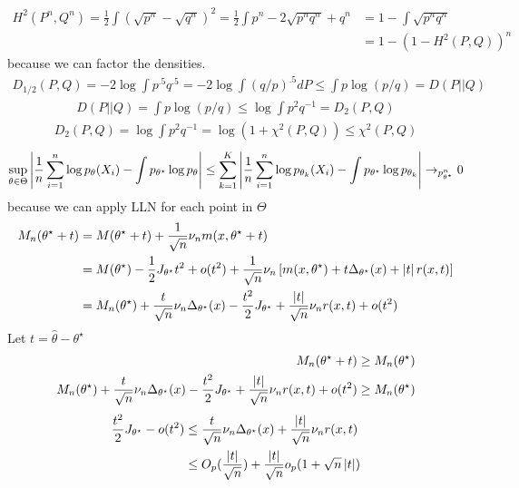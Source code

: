 \documentclass[hidequestions]{homework}
\begin{document}
\subproblem 
\begin{align*}
    H^2(P^n,Q^n) = \frac{1}{2}\int(\sqrt{p^n}-\sqrt{q^n})^2 = \frac{1}{2}\int p^n - 2\sqrt{p^nq^n} + q^n &= 1 - \int \sqrt{p^nq^n}\\
    &= 1-(1-H^2(P,Q))^n
\end{align*}
because we can factor the densities.
\problem 
\subproblem 
\begin{align*}
    D_{1/2}(P,Q) = -2\log \int p^{.5}q^{.5} = -2 \log \int (q/p)^{.5} dP \leq \int p\log(p/q) = D(P\vert\vert Q)
\end{align*}
\subproblem
\begin{align*}
    D(P\vert\vert Q) = \int p\log(p/q) \leq \log \int p^2 q^{-1} =D_2(P,Q)
\end{align*}
\subproblem 
\begin{align*}
    D_2(P,Q) =\log \int p^2 q^{-1} = \log(1 + \chi^2(P,Q)) \leq \chi^2(P,Q)
\end{align*}
\problem 
\begin{align*}
    \sup_{\theta\in\Theta}\left\vert{\frac{1}{n}\sum_{i=1}^{n}\log p_\theta(X_i)-\int p_{\theta^\star}\log p_\theta}\right\vert \leq \sum_{k=1}^{K}\left\vert{\frac{1}{n}\sum_{i=1}^{n}\log p_{\theta_k}(X_i)-\int p_{\theta^\star}\log p_{\theta_k}}\right\vert \rightarrow_{p_{\theta^\star}^n} 0
\end{align*}
because we can apply LLN for each point in $\Theta$
\problem 
\problem 
\subproblem
\begin{align*}
    M_n(\theta^\star + t) &= M(\theta^\star + t) + \frac{1}{\sqrt{n}}\nu_n m(x, \theta^\star + t)\\
    &= M(\theta^\star) - \frac{1}{2}J_{\theta^\star}t^2 + o(t^2) + \frac{1}{\sqrt{n}}\nu_n\left[m(x,\theta^\star) + t\Delta_{\theta^\star}(x) + \left\vert{t}\right\vert r(x,t)\right]\\
    &= M_n(\theta^\star) + \frac{t}{\sqrt{n}}\nu_n\Delta_{\theta^\star}(x) - \frac{t^2}{2}J_{\theta^\star} + \frac{\left\vert{t}\right\vert}{\sqrt{n}}\nu_n r(x,t) + o(t^2)
\end{align*}
\subproblem
Let $t = \hat{\theta} - \theta^\star$
\begin{align*}
    M_n(\theta^\star + t) \geq M_n(\theta^\star)\\
    M_n(\theta^\star) + \frac{t}{\sqrt{n}}\nu_n\Delta_{\theta^\star}(x) - \frac{t^2}{2}J_{\theta^\star} + \frac{\left\vert{t}\right\vert}{\sqrt{n}}\nu_n r(x,t) + o(t^2) \geq M_n(\theta^\star)
\end{align*}
\begin{align*}
    \frac{t^2}{2}J_{\theta^\star} - o(t^2) &\leq \frac{t}{\sqrt{n}}\nu_n\Delta_{\theta^\star}(x) + \frac{\left\vert{t}\right\vert}{\sqrt{n}}\nu_n r(x,t)\\
    &\leq O_p(\frac{\left\vert{t}\right\vert}{\sqrt{n}}) + \frac{\left\vert{t}\right\vert}{\sqrt{n}}o_p(1+\sqrt{n}\left\vert{t}\right\vert)
\end{align*}
\end{document}
